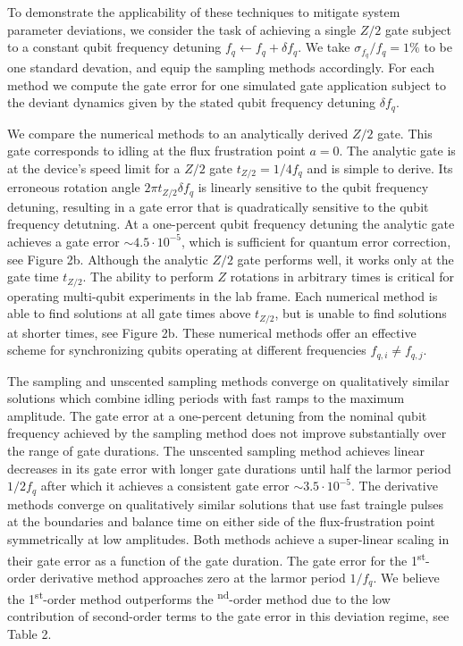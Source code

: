 \documentclass[
  amsfonts,
  amsmath,
  tbtags,
  amssymb,
  aps,
  nobibnotes,
  twocolumn,
  superscriptaddress,
]{revtex4-2}
\begin{document}
To demonstrate the applicability of these techniques
to mitigate system parameter deviations,
we consider the task of achieving a single $Z/2$
gate subject to a constant qubit frequency detuning
$f_{q} \gets f_{q} + \delta f_{q}$.
We take $\sigma_{f_{q}} / f_{q} = 1\%$ to be one standard devation, and equip
the sampling methods accordingly. For each method we compute the gate error for
one simulated gate application subject to the deviant dynamics given by the
stated qubit frequency detuning $\delta f_{q}$.

We compare the numerical methods
to an analytically derived $Z/2$ gate. This gate corresponds to
idling at the flux frustration point $a = 0$. The analytic gate
is at the device's speed limit for a $Z/2$ gate $t_{Z/2} = 1 / 4 f_{q}$ and
is simple to derive. Its erroneous rotation angle $2 \pi t_{Z/2} \delta f_{q}$ is linearly sensitive to
the qubit frequency detuning, resulting in a gate error that is quadratically sensitive
to the qubit frequency detutning.
At a one-percent
qubit frequency detuning the analytic gate achieves a gate error $\sim 4.5 \cdot 10^{-5}$,
which is sufficient for quantum error correction, see Figure 2b.
Although the analytic $Z/2$ gate performs well, it works
only at the gate time $t_{Z/2}$. The ability to perform $Z$ rotations in arbitrary times is critical
for operating multi-qubit experiments in the lab frame.
Each numerical method is able to find solutions at
all gate times above $t_{Z/2}$, but is unable to find solutions at shorter times,
see Figure 2b. These numerical methods offer an effective scheme for synchronizing
qubits operating at different frequencies $f_{q, i} \neq f_{q, j}$.

The sampling and unscented sampling methods
converge on qualitatively similar solutions which combine idling periods
with fast ramps to the maximum amplitude. The gate error at a one-percent
detuning from the nominal qubit frequency achieved
by the sampling method does not improve substantially over the
range of gate durations. The unscented sampling method
achieves linear decreases in its gate error with longer gate durations
until half the larmor period $1 / 2 f_{q}$ after which it achieves a consistent
gate error $\sim 3.5 \cdot 10^{-5}$.
The derivative methods converge on qualitatively similar solutions that
use fast traingle pulses at the boundaries and balance time
on either side of the flux-frustration point symmetrically at low amplitudes.
Both methods achieve a super-linear scaling in their gate error as
a function of the gate duration. The gate error for the 1\textsuperscript{st}-order
derivative method approaches zero at the larmor period $1 / f_{q}$.
We believe the 1\textsuperscript{st}-order method outperforms the \textsuperscript{nd}-order
method due to the low contribution of second-order
terms to the gate error in this deviation regime, see Table 2.
\end{document}
